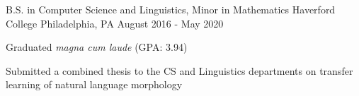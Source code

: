 

\begin{cventries}

  \cventry
    {B.S. in Computer Science and Linguistics, Minor in Mathematics}
    {Haverford College}
    {Philadelphia, PA}
    {August 2016 - May 2020}
    {
      \begin{cvitems}
        \item {Graduated \textit{magna cum laude} (GPA: 3.94) }
        \item {Submitted a combined thesis to the CS and Linguistics departments on transfer learning of natural language morphology}
      \end{cvitems}
    }

\end{cventries}

